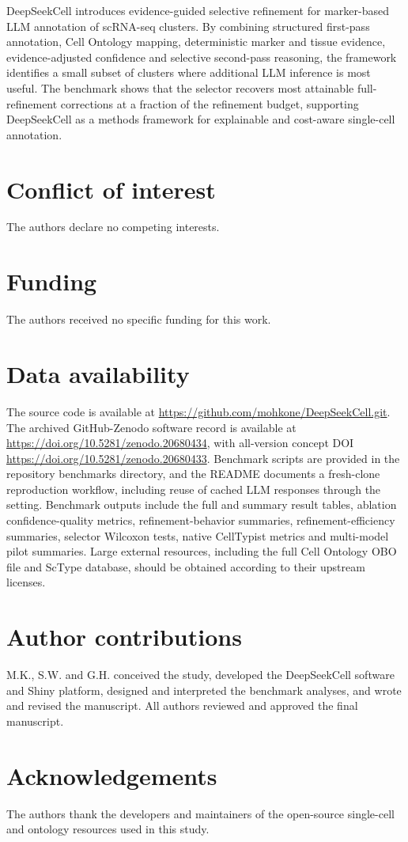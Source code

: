 \documentclass[unnumsec,webpdf,contemporary,large,numbered]{oup-authoring-template}
\begin{document}
DeepSeekCell introduces evidence-guided selective refinement for marker-based LLM annotation of scRNA-seq clusters. By combining structured first-pass annotation, Cell Ontology mapping, deterministic marker and tissue evidence, evidence-adjusted confidence and selective second-pass reasoning, the framework identifies a small subset of clusters where additional LLM inference is most useful. The benchmark shows that the selector recovers most attainable full-refinement corrections at a fraction of the refinement budget, supporting DeepSeekCell as a methods framework for explainable and cost-aware single-cell annotation.

\section{Conflict of interest}
The authors declare no competing interests.

\section{Funding}
The authors received no specific funding for this work.

\section{Data availability}
The source code is available at \url{https://github.com/mohkone/DeepSeekCell.git}. The archived GitHub-Zenodo software record is available at \url{https://doi.org/10.5281/zenodo.20680434}, with all-version concept DOI \url{https://doi.org/10.5281/zenodo.20680433}. Benchmark scripts are provided in the repository benchmarks directory, and the README documents a fresh-clone reproduction workflow, including reuse of cached LLM responses through the  setting. Benchmark outputs include the full and summary result tables, ablation confidence-quality metrics, refinement-behavior summaries, refinement-efficiency summaries, selector Wilcoxon tests, native CellTypist metrics and multi-model pilot summaries. Large external resources, including the full Cell Ontology OBO file and ScType database, should be obtained according to their upstream licenses.

\section{Author contributions}
M.K., S.W. and G.H. conceived the study, developed the DeepSeekCell software and Shiny platform, designed and interpreted the benchmark analyses, and wrote and revised the manuscript. All authors reviewed and approved the final manuscript.

\section{Acknowledgements}
The authors thank the developers and maintainers of the open-source single-cell and ontology resources used in this study.



\end{document}
